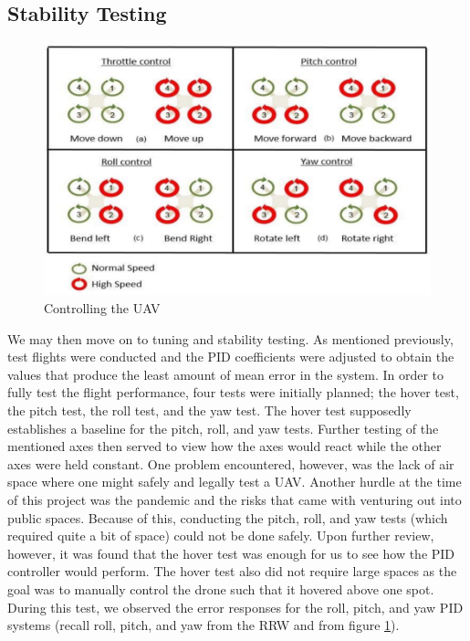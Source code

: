 \documentclass[english]{upeeei}
\begin{document}
\subsection{Stability Testing}
\begin{figure}[h]
    \centering
    \includegraphics[scale=0.5]{images/motor_signals.PNG}
    \caption{Controlling the UAV \cite{fcDesign2019}}
    \label{fig:motor_signals}
\end{figure}
We may then move on to tuning and stability testing. As mentioned previously, test flights
were conducted and the PID coefficients were adjusted to obtain the values that produce the least amount of mean error in the
system. In order to fully test the flight performance, four tests were initially planned; the hover test, the pitch test, the roll test, and
the yaw test. The hover test supposedly establishes a baseline for the pitch, roll, and yaw tests. Further testing of the mentioned axes then
served to view how the axes would react while the other axes were held constant. One problem encountered, however, was the lack of air space where
one might safely and legally test a UAV. Another hurdle at the time of this project was the pandemic and the risks that came with venturing 
out into public spaces. Because of this, conducting the pitch, roll, and yaw tests (which required quite a bit of space) could not be done safely.
Upon further review\cite{zimmerman2016}, however, it was found that the hover test was enough for us to see how the PID controller would perform.
The hover test also did not require large spaces as the goal was to manually control the drone such that it hovered above one spot. 
During this test, we observed the error
responses for the roll, pitch, and yaw PID systems (recall roll, pitch, and yaw from the RRW and from figure \ref{fig:motor_signals}).
\end{document}
